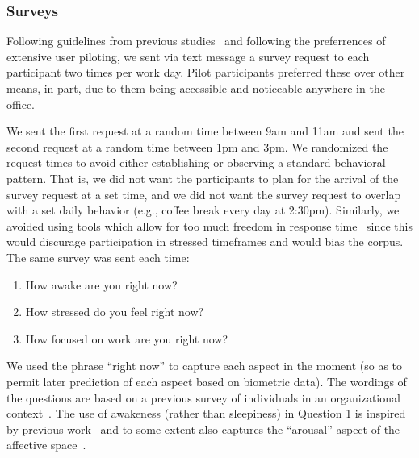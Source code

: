 \subsubsection{Surveys}
\label{sec:Surveys}
Following guidelines from previous studies~\cite{Lalle16,Panwar18,Luo18} and 
following the preferrences of extensive user piloting, we sent via 
text message a survey request to each participant two times per 
work day. Pilot participants preferred these over other means, in part, due 
to them being accessible and noticeable anywhere in the office. 

We sent the 
first request at a random time between 9am and 11am 
and sent the second request at a random time between 1pm and 3pm. We 
randomized the request times to avoid either establishing or observing a 
standard behavioral pattern. That is, we did not want the participants to 
plan for the arrival of the survey request at a set time, and we did not 
want the survey request to overlap with a set daily behavior (e.g., coffee 
break every day at 2:30pm). Similarly, we avoided using tools which allow 
for too much freedom in response time~\cite{Adams18} since this would 
discurage participation in stressed timeframes and would bias the 
corpus. 
The same survey was sent each time:
\begin{enumerate}
\item How awake are you right now?
\item How stressed do you feel right now?
\item How focused on work are you right now? 
\end{enumerate}
We used the phrase ``right now'' to capture each aspect in the moment (so as to permit later prediction of each aspect based on biometric data). The wordings of the questions are based on a previous survey of individuals in an organizational context~\cite{Gloor_etal:2010}. The use of awakeness (rather than sleepiness) in Question 1 is inspired by previous work~\cite{Wilhelm_Schoebi:2007} and to some extent also captures the ``arousal'' aspect of the affective space~\cite{Russell:1980}.



